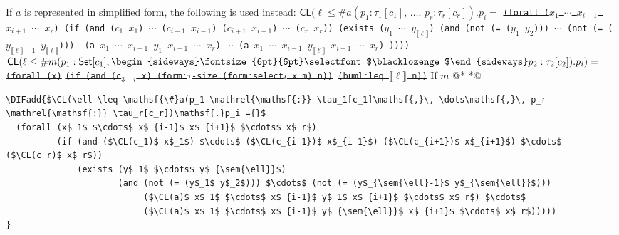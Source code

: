 \documentclass[10pt,fleqn,final]{scrreprt}
\newcommand*{\CL}{\ensuremath{\mathsf{CL}}\xspace}
\newenvironment{definitions}[0]{\medskip }{}
\newcommand{\composition}{\raisebox{0.2pt}{\begin{sideways}\fontsize{6pt}{6pt}\selectfont$\blacklozenge$\end{sideways}}}
\newcommand{\sem}[1]{\mathopen\llbracket#1\mathclose\rrbracket}
\newcommand{\white}[1]{{\color{white}{#1}}}
\newcommand{\qqquad}{\white{x}\qquad}
\providecommand{\DIFadd}[1]{{\protect\color{blue}\uwave{#1}}} %
\providecommand{\DIFdel}[1]{{\protect\color{red}\sout{#1}}}                      %
\providecommand{\DIFaddbegin}{} %
\providecommand{\DIFaddend}{} %
\providecommand{\DIFdelbegin}{} %
\providecommand{\DIFdelend}{} %
\begin{document}
\begin{definitions}
\noindent \DIFaddend If $a$ is represented in simplified form, the following is used instead:
\DIFdelbegin %
\DIFdel{$\CL(\ell \leq \mathsf{\#}a(p_1 \mathrel{\mathsf{:}} \tau_1[c_1]\mathsf{,}\, \dots\mathsf{,}\, p_r \mathrel{\mathsf{:}} \tau_r[c_r])\mathsf{.}p_i=$}%
\texttt{\DIFdel{(forall ($x_1$ $\cdots$ $x_{i-1}$ $x_{i+1}$ $\cdots$ $x_r$)}%
\DIFdel{(if (and ($c_1$ $x_1$) $\cdots$ ($c_{i-1}$ $x_{i-1}$) ($c_{i+1}$ $x_{i+1}$) $\cdots$ ($c_r$ $x_r$))}%
\DIFdel{(exists ($y_1$ $\cdots$ $y_{\sem{\ell}}$)}%
\DIFdel{(and (not (= ($y_1$ $y_2$))) $\cdots$  (not (= ($y_{\sem{\ell}-1}$ $y_{\sem{\ell}}$))) }%
\DIFdel{(a $x_1$ $\cdots$ $x_{i-1}$ $y_1$ $x_{i+1}$ $\cdots$ $x_r$)}%
\DIFdel{$\cdots$}%
\DIFdel{(a $x_1$ $\cdots$ $x_{i-1}$ $y_{\sem{\ell}}$ $x_{i+1}$ $\cdots$ $x_r$) ))))}}
\DIFdel{$\CL(\ell \leq \mathsf{\#}m(p_1 \mathrel{\mathsf{:}} \mathsf{Set}[c_1]\mathsf{,}\, \composition p_2 \mathrel{\mathsf{:}} \tau_2[c_2])\mathsf{.}p_i)=$}%
\texttt{\DIFdel{(forall (x)}}%
\texttt{\DIFdel{(if (and (c$_{3-i}$ x) (form:$\tau$-size (form:select$i$ x m) n))}%
\DIFdel{(buml:leq $\sem{\ell}$ n))}}%
\DIFdel{If $m$ }\DIFdelend @*   *@ \DIFaddbegin \begin{lstlisting}[language=clif, mathescape]
\DIFadd{$\CL(\ell \leq \mathsf{\#}a(p_1 \mathrel{\mathsf{:}} \tau_1[c_1]\mathsf{,}\, \dots\mathsf{,}\, p_r \mathrel{\mathsf{:}} \tau_r[c_r])\mathsf{.}p_i ={}$
  (forall (x$_1$ $\cdots$ x$_{i-1}$ x$_{i+1}$ $\cdots$ x$_r$)
          (if (and ($\CL(c_1)$ x$_1$) $\cdots$ ($\CL(c_{i-1})$ x$_{i-1}$) ($\CL(c_{i+1})$ x$_{i+1}$) $\cdots$ ($\CL(c_r)$ x$_r$))
              (exists (y$_1$ $\cdots$ y$_{\sem{\ell}}$)
                      (and (not (= (y$_1$ y$_2$))) $\cdots$ (not (= (y$_{\sem{\ell}-1}$ y$_{\sem{\ell}}$)))
                           ($\CL(a)$ x$_1$ $\cdots$ x$_{i-1}$ y$_1$ x$_{i+1}$ $\cdots$ x$_r$) $\cdots$
                           ($\CL(a)$ x$_1$ $\cdots$ x$_{i-1}$ y$_{\sem{\ell}}$ x$_{i+1}$ $\cdots$ x$_r$)))))
}\end{lstlisting}


\end{definitions}
\end{document}
